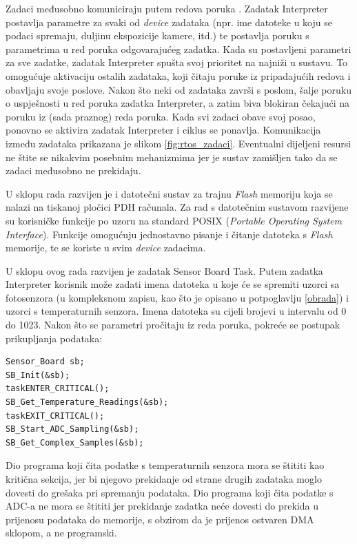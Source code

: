 Zadaci međusobno komuniciraju putem redova poruka . Zadatak Interpreter postavlja parametre za svaki od \textit{device} zadataka (npr. ime datoteke u koju se podaci spremaju, duljinu ekspozicije kamere, itd.) te postavlja poruku s parametrima u red poruka odgovarajućeg zadatka. Kada su postavljeni parametri za sve zadatke, zadatak Interpreter spušta svoj prioritet na najniži u sustavu. To omogućuje aktivaciju ostalih zadataka, koji čitaju poruke iz pripadajućih redova i obavljaju svoje poslove. Nakon što neki od zadataka završi s poslom, šalje poruku o uspješnosti u red poruka zadatka Interpreter, a zatim biva blokiran čekajući na poruku iz (sada praznog) reda poruka. Kada svi zadaci obave svoj posao, ponovno se aktivira zadatak Interpreter i ciklus se ponavlja. Komunikacija između zadataka prikazana je slikom \ref{fig:rtos_zadaci}. Eventualni dijeljeni resursi ne štite se nikakvim posebnim mehanizmima jer je sustav zamišljen tako da se zadaci međusobno ne prekidaju.

U sklopu rada \cite{diplomski_goran_petrak} razvijen je i datotečni sustav za trajnu \textit{Flash} memoriju koja se nalazi na tiskanoj pločici PDH računala. Za rad s datotečnim sustavom razvijene su korisničke funkcije po uzoru na standard POSIX (\textit{Portable Operating System Interface}). Funkcije omogućuju jednostavno pisanje i čitanje datoteka s \textit{Flash} memorije, te se koriste u svim \textit{device} zadacima.

U sklopu ovog rada razvijen je zadatak Sensor Board Task. Putem zadatka Interpreter korisnik može zadati imena datoteka u koje će se spremiti uzorci sa fotosenzora (u kompleksnom zapisu, kao što je opisano u potpoglavlju \ref{obrada}) i uzorci s temperaturnih senzora. Imena datoteka su cijeli brojevi u intervalu od 0 do 1023. Nakon što se parametri pročitaju iz reda poruka, pokreće se postupak prikupljanja podataka:

\begin{lstlisting}[caption={Prikupljanje podataka u sklopu zadatka za upravljanje senzorskim podsustavom}]
Sensor_Board sb;
SB_Init(&sb);
taskENTER_CRITICAL();
SB_Get_Temperature_Readings(&sb);
taskEXIT_CRITICAL();
SB_Start_ADC_Sampling(&sb);
SB_Get_Complex_Samples(&sb);
\end{lstlisting}

Dio programa koji čita podatke s temperaturnih senzora mora se štititi kao kritična sekcija, jer bi njegovo prekidanje od strane drugih zadataka moglo dovesti do grešaka pri spremanju podataka. Dio programa koji čita podatke s ADC-a ne mora se štititi jer prekidanje zadatka neće dovesti do prekida u prijenosu podataka do memorije, s obzirom da je prijenos ostvaren DMA sklopom, a ne programski.

